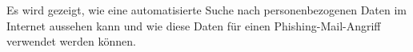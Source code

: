 \label{cha:kurzfassung} 
Es wird gezeigt, wie eine automatisierte Suche nach personenbezogenen Daten im Internet aussehen kann und wie diese Daten für einen Phishing-Mail-Angriff verwendet werden können. 





